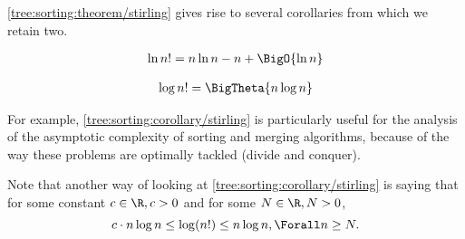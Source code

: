 \ref{tree:sorting:theorem/stirling} gives rise to several corollaries from
which we retain two.
\begin{corollary}
\begin{align*}
\ln n! &= n \ln n - n + \BigO{\ln n}\\
\end{align*}
\end{corollary}
\begin{corollary}
\label{tree:sorting:corollary/stirling}
\begin{align*}
\log n! &= \BigTheta{n \log n}\\
\end{align*}
\end{corollary}
For example, \ref{tree:sorting:corollary/stirling} is particularly useful
for the analysis of the asymptotic complexity of sorting and merging algorithms, because
of the way these problems are optimally tackled (divide and conquer).

Note that another way of looking at \ref{tree:sorting:corollary/stirling} is
saying that for some constant $c \in \R, c > 0$ and for some $N \in \R, N > 0$,
\begin{displaymath}
c \cdot n \log n \leq \log(n!) \leq n \log n, \Forall n \geq N.
\end{displaymath}

